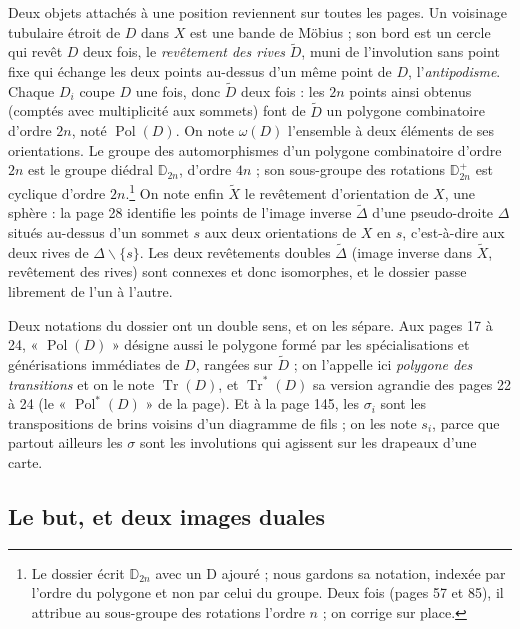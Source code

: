 \documentclass[11pt,a4paper]{article}
\begin{document}
Deux objets attachés à une position reviennent sur toutes les pages. Un
voisinage tubulaire étroit de $D$ dans $X$ est une bande de Möbius ; son bord
est un cercle qui revêt $D$ deux fois, le \emph{revêtement des rives}
$\widetilde{D}$, muni de l'involution sans point fixe qui échange les deux
points au-dessus d'un même point de $D$, l'\emph{antipodisme}. Chaque $D_i$
coupe $D$ une fois, donc $\widetilde{D}$ deux fois : les $2n$ points ainsi
obtenus (comptés avec multiplicité aux sommets) font de $\widetilde{D}$ un
polygone combinatoire d'ordre $2n$, noté $\operatorname{Pol}(D)$. On note
$\omega(D)$ l'ensemble à deux éléments de ses orientations. Le groupe des
automorphismes d'un polygone combinatoire d'ordre $2n$ est le groupe diédral
$\mathbb{D}_{2n}$, d'ordre $4n$ ; son sous-groupe des rotations
$\mathbb{D}^{+}_{2n}$ est cyclique d'ordre $2n$.\footnote{Le dossier écrit
$\mathbb{D}_{2n}$ avec un D ajouré ; nous gardons sa notation, indexée par
l'ordre du polygone et non par celui du groupe. Deux fois (pages 57 et 85), il
attribue au sous-groupe des rotations l'ordre $n$ ; on corrige sur place.} On
note enfin $\widetilde{X}$ le revêtement d'orientation de $X$, une sphère : la
page 28 identifie les points de l'image inverse $\widetilde{\Delta}$ d'une
pseudo-droite $\Delta$ situés au-dessus d'un sommet $s$ aux deux orientations
de $X$ en $s$, c'est-à-dire aux deux rives de $\Delta \smallsetminus \lbrace s
\rbrace$. Les deux revêtements doubles $\widetilde{\Delta}$ (image inverse
dans $\widetilde{X}$, revêtement des rives) sont connexes et donc isomorphes,
et le dossier passe librement de l'un à l'autre.

Deux notations du dossier ont un double sens, et on les sépare. Aux pages 17 à
24, « $\operatorname{Pol}(D)$ » désigne aussi le polygone formé par les
spécialisations et générisations immédiates de $D$, rangées sur
$\widetilde{D}$ ; on l'appelle ici \emph{polygone des transitions} et on le
note $\operatorname{Tr}(D)$, et $\operatorname{Tr}^{*}(D)$ sa version agrandie
des pages 22 à 24 (le « $\operatorname{Pol}^{*}(D)$ » de la page). Et à la page
145, les $\sigma_i$ sont les transpositions de brins voisins d'un diagramme de
fils ; on les note $s_i$, parce que partout ailleurs les $\sigma$ sont les
involutions qui agissent sur les drapeaux d'une carte.

\subsection*{Le but, et deux images duales}
\end{document}
